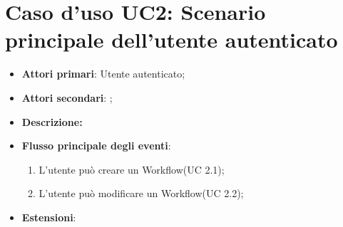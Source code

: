 \section{Caso d'uso UC2: Scenario principale dell'utente autenticato}
\begin{itemize}
	\item \textbf{Attori primari}: Utente autenticato;
	\item \textbf{Attori secondari}: ;
	\item \textbf{Descrizione:}
	\item \textbf{Flusso principale degli eventi}:
	\begin{enumerate}
		\item L'utente può creare un Workflow(UC 2.1);
		\item L'utente può modificare un Workflow(UC 2.2);
	\end{enumerate}
	\item \textbf{Estensioni}:

\end{itemize}



